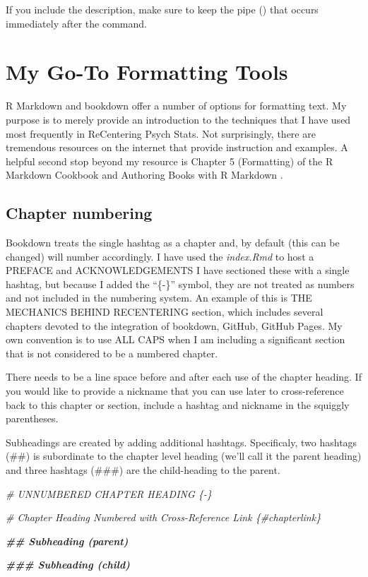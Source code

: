 \documentclass[
]{book}
\newenvironment{Shaded}{\begin{snugshade}}{\end{snugshade}}
\newcommand{\CommentTok}[1]{\textcolor[rgb]{0.56,0.35,0.01}{\textit{#1}}}
\newcommand{\DocumentationTok}[1]{\textcolor[rgb]{0.56,0.35,0.01}{\textbf{\textit{#1}}}}
\begin{document}
If you include the description, make sure to keep the pipe (\textbar) that occurs immediately after the command.

\hypertarget{my-go-to-formatting-tools}{%
\section{My Go-To Formatting Tools}\label{my-go-to-formatting-tools}}

R Markdown and bookdown offer a number of options for formatting text. My purpose is to merely provide an introduction to the techniques that I have used most frequently in ReCentering Psych Stats. Not surprisingly, there are tremendous resources on the internet that provide instruction and examples. A helpful second stop beyond my resource is Chapter 5 (Formatting) of the R Markdown Cookbook \citep{xie_r_2021} and Authoring Books with R Markdown \citep{xie_54_nodate}.

\hypertarget{chapter-numbering}{%
\subsection{Chapter numbering}\label{chapter-numbering}}

Bookdown treats the single hashtag as a chapter and, by default (this can be changed) will number accordingly. I have used the \emph{index.Rmd} to host a PREFACE and ACKNOWLEDGEMENTS I have sectioned these with a single hashtag, but because I added the ``\{-\}'' symbol, they are not treated as numbers and not included in the numbering system. An example of this is THE MECHANICS BEHIND RECENTERING section, which includes several chapters devoted to the integration of bookdown, GitHub, GitHub Pages. My own convention is to use ALL CAPS when I am including a significant section that is not considered to be a numbered chapter.

There needs to be a line space before and after each use of the chapter heading. If you would like to provide a nickname that you can use later to cross-reference back to this chapter or section, include a hashtag and nickname in the squiggly parentheses.

Subheadings are created by adding additional hashtags. Specificaly, two hashtags (\#\#) is subordinate to the chapter level heading (we'll call it the parent heading) and three hashtags (\#\#\#) are the child-heading to the parent.

\begin{Shaded}
\begin{Highlighting}[]
\CommentTok{\# UNNUMBERED CHAPTER HEADING \{{-}\}}

\CommentTok{\# Chapter Heading Numbered with Cross{-}Reference Link \{\#chapterlink\}}

\DocumentationTok{\#\# Subheading (parent)}

\DocumentationTok{\#\#\# Subheading (child)}
\end{Highlighting}
\end{Shaded}
\end{document}
